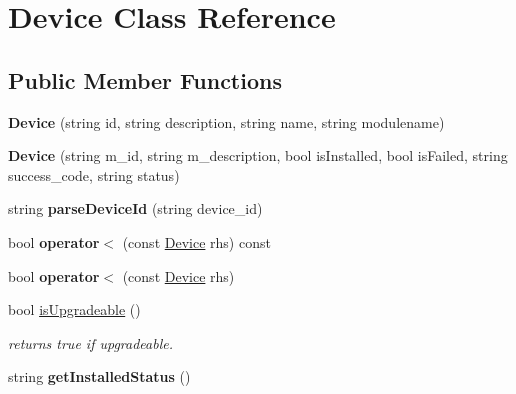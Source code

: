 \hypertarget{classDevice}{}\section{Device Class Reference}
\label{classDevice}
\subsection*{Public Member Functions}
\begin{DoxyCompactItemize}
\item 
\mbox{\label{classDevice_a107e7a95a02edc5ff586dfc831f1eb76}} 
{\bfseries Device} (string id, string description, string name, string modulename)
\item 
\mbox{\label{classDevice_a11aa3e7c780559e7749bea3ac702e55e}} 
{\bfseries Device} (string m\+\_\+id, string m\+\_\+description, bool is\+Installed, bool is\+Failed, string success\+\_\+code, string status)
\item 
\mbox{\label{classDevice_a0c77b871987e94ec9088e8ab78f27293}} 
string {\bfseries parse\+Device\+Id} (string device\+\_\+id)
\item 
\mbox{\label{classDevice_acd077de5b2954ce456927e021c5de5df}} 
bool {\bfseries operator$<$} (const \hyperlink{classDevice}{Device} rhs) const
\item 
\mbox{\label{classDevice_a660d5da7a710da202ac6c58766370283}} 
bool {\bfseries operator$<$} (const \hyperlink{classDevice}{Device} rhs)
\item 
\mbox{\label{classDevice_a1078839b751f8366b5170d4daefa26b4}} 
bool \hyperlink{classDevice_a1078839b751f8366b5170d4daefa26b4}{is\+Upgradeable} ()
\begin{DoxyCompactList}\small\item\em returns true if upgradeable. \end{DoxyCompactList}\item 
\mbox{\label{classDevice_abdadd7bc6fa1760aeaa9f87dd2f96f59}} 
string {\bfseries get\+Installed\+Status} ()
\item 
\mbox{\label{classDevice_a2036c2bc77979808046f7ecae94ec602}} 

\end{DoxyCompactItemize}
